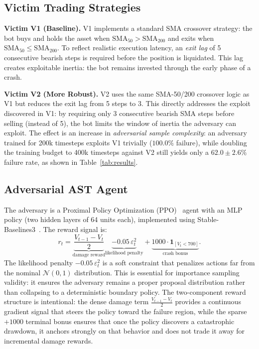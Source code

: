 \documentclass[conference]{IEEEtran}
\newcommand{\mathds}[1]{\mathbf{#1}}
\begin{document}
\subsection{Victim Trading Strategies}

\textbf{Victim V1 (Baseline).}
V1 implements a standard SMA crossover strategy: the bot buys and holds
the asset when $\text{SMA}_{50} > \text{SMA}_{200}$ and exits when
$\text{SMA}_{50} \leq \text{SMA}_{200}$. To reflect realistic execution
latency, an \emph{exit lag} of 5 consecutive bearish steps is required
before the position is liquidated. This lag creates exploitable inertia:
the bot remains invested through the early phase of a crash.

\textbf{Victim V2 (More Robust).}
V2 uses the same SMA-50/200 crossover logic as V1 but reduces the exit lag
from 5 steps to 3. This directly addresses the exploit discovered in V1:
by requiring only 3 consecutive bearish SMA steps before selling (instead of
5), the bot limits the window of inertia the adversary can exploit. The
effect is an increase in \emph{adversarial sample complexity}: an adversary
trained for 200k timesteps exploits V1 trivially ($100.0\%$ failure), while
doubling the training budget to 400k timesteps against V2 still yields only
a $62.0 \pm 2.6\%$ failure rate, as shown in Table~\ref{tab:results}.

\subsection{Adversarial AST Agent}

The adversary is a Proximal Policy Optimization (PPO)~\cite{schulman2017ppo}
agent with an MLP policy (two hidden layers of 64 units each), implemented
using Stable-Baselines3~\cite{raffin2021sb3}. The reward signal is:
\begin{equation}
  r_t = \underbrace{\frac{V_{t-1} - V_t}{2}}_{\text{damage reward}}
       \underbrace{- 0.05\,\varepsilon_t^2}_{\text{likelihood penalty}}
       + \underbrace{1000 \cdot \mathds{1}_{[V_t < 700]}}_{\text{crash bonus}}.
\end{equation}
The likelihood penalty $-0.05\,\varepsilon_t^2$ is a soft constraint that
penalizes actions far from the nominal $\mathcal{N}(0,1)$ distribution.
This is essential for importance sampling validity: it ensures the adversary
remains a proper proposal distribution rather than collapsing to a
deterministic boundary policy. The two-component reward structure is
intentional: the dense damage term $\tfrac{V_{t-1}-V_t}{2}$ provides a
continuous gradient signal that steers the policy toward the failure region,
while the sparse $+1000$ terminal bonus ensures that once the policy
discovers a catastrophic drawdown, it anchors strongly on that behavior
and does not trade it away for incremental damage rewards.
\end{document}
